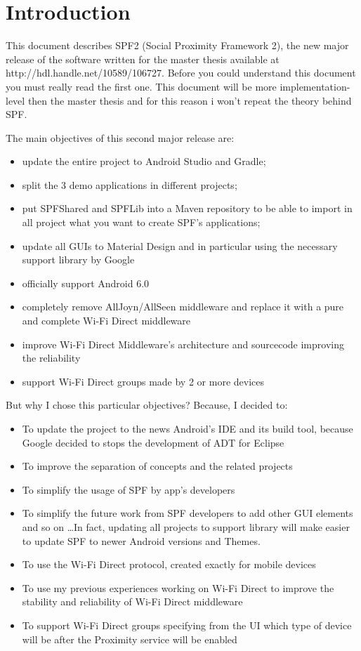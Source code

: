 \chapter{Introduction}
\label{chap1}

This document describes SPF2 (Social Proximity Framework 2), the new major release of the software written for the master thesis available at http://hdl.handle.net/10589/106727. Before you could understand this document you must really read the first one. This document will be more implementation-level then the master thesis and for this reason i won't repeat the theory behind SPF.

The main objectives of this second major release are:
\begin{itemize}
	\item update the entire project to Android Studio and Gradle;
	\item split the 3 demo applications in different projects;
	\item put SPFShared and SPFLib into a Maven repository to be able to import in all project what you want to create SPF's applications;
	\item update all GUIs to Material Design and in particular using the necessary support library by Google
	\item officially support Android 6.0
	\item completely remove AllJoyn/AllSeen middleware and replace it with a pure and complete Wi-Fi Direct middleware
	\item improve Wi-Fi Direct Middleware's architecture and sourcecode improving the reliability
	\item support Wi-Fi Direct groups made by 2 or more devices
\end{itemize}

But why I chose this particular objectives? Because, I decided to:
\begin{itemize}
	\item To update the project to the news Android's IDE and its build tool, because Google decided to stops the development of ADT for Eclipse
	\item To improve the separation of concepts and the related projects
	\item To simplify the usage of SPF by app's developers
	\item To simplify the future work from SPF developers to add other GUI elements and so on \dots In fact, updating all projects to support library will make easier to update SPF to newer Android versions and Themes.
	\item To use the Wi-Fi Direct protocol, created exactly for mobile devices
	\item To use my previous experiences working on Wi-Fi Direct to improve the stability and reliability of Wi-Fi Direct middleware
	\item To support Wi-Fi Direct groups specifying from the UI which type of device will be after the Proximity service will be enabled
\end{itemize}

